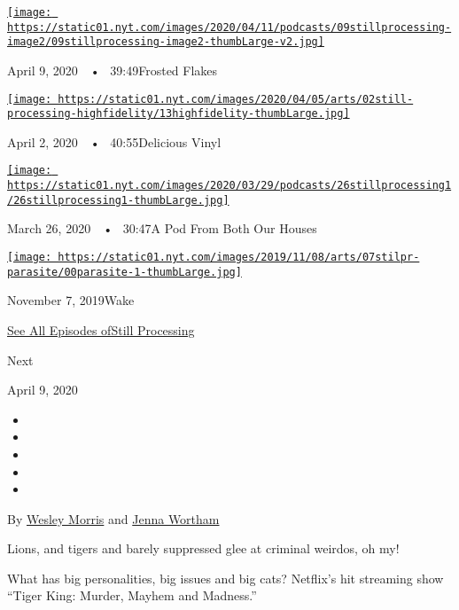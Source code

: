 \href{https://www.nytimes.com/2020/04/09/podcasts/still-processing-tiger-king.html?action=click\&module=audio-series-bar\&region=header\&pgtype=Article}{\texttt{[image: https://static01.nyt.com/images/2020/04/11/podcasts/09stillprocessing-image2/09stillprocessing-image2-thumbLarge-v2.jpg]}}

April 9, 2020~~•~ 39:49Frosted Flakes

\href{https://www.nytimes.com/2020/04/02/podcasts/high-fidelity-zoe-kravitz.html?action=click\&module=audio-series-bar\&region=header\&pgtype=Article}{\texttt{[image: https://static01.nyt.com/images/2020/04/05/arts/02still-processing-highfidelity/13highfidelity-thumbLarge.jpg]}}

April 2, 2020~~•~ 40:55Delicious Vinyl

\href{https://www.nytimes.com/2020/03/26/podcasts/still-processing-quarantine.html?action=click\&module=audio-series-bar\&region=header\&pgtype=Article}{\texttt{[image: https://static01.nyt.com/images/2020/03/29/podcasts/26stillprocessing1/26stillprocessing1-thumbLarge.jpg]}}

March 26, 2020~~•~ 30:47A Pod From Both Our Houses

\href{https://www.nytimes.com/2019/11/07/podcasts/still-processing-parasite-watchmen-bong-joon-ho.html?action=click\&module=audio-series-bar\&region=header\&pgtype=Article}{\texttt{[image: https://static01.nyt.com/images/2019/11/08/arts/07stilpr-parasite/00parasite-1-thumbLarge.jpg]}}

November 7, 2019Wake

\href{https://www.nytimes.com/column/still-processing-podcast}{See All
Episodes ofStill Processing}

Next

April 9, 2020

\begin{itemize}
\item
\item
\item
\item
\item
\end{itemize}

By \href{https://www.nytimes.com/by/wesley-morris}{Wesley Morris} and
\href{https://www.nytimes.com/by/jenna-wortham}{Jenna Wortham}

Lions, and tigers and barely suppressed glee at criminal weirdos, oh my!

What has big personalities, big issues and big cats? Netflix's hit
streaming show ``Tiger King: Murder, Mayhem and Madness.''

